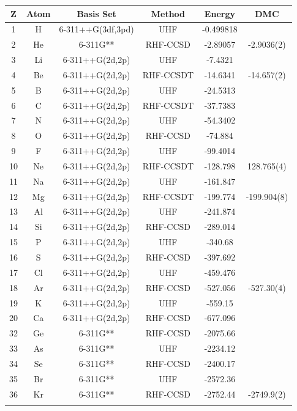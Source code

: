 \documentclass[a4paper,norsk,11pt,twoside]{report}
\begin{document}
\begin{center}
\begin{tabular}{ c c c c c c }
	\hline
  	Z & Atom & Basis Set & Method & Energy & DMC \\ \hline
  	1 & H & 6-311++G(3df,3pd) & UHF & -0.499818
  	&  \\
  	2 & He & 6-311G** & RHF-CCSD & -2.89057 
  	& -2.9036(2) \\ \hline
  	3 & Li & 6-311++G(2d,2p) & UHF & -7.4321 
  	& \\
  	4 & Be & 6-311++G(2d,2p) & RHF-CCSDT & -14.6341 & -14.657(2) \\
  	5 & B & 6-311++G(2d,2p) & UHF & -24.5313& \\
  	6 & C & 6-311++G(2d,2p) & RHF-CCSDT & -37.7383 &\\
  	7 & N & 6-311++G(2d,2p) & UHF & -54.3402 &\\
  	8 & O & 6-311++G(2d,2p) & RHF-CCSD & -74.884& \\
  	9 & F & 6-311++G(2d,2p) & UHF & -99.4014& \\
  	10 & Ne & 6-311++G(2d,2p) & RHF-CCSDT & -128.798 & 128.765(4) \\  \hline
  	11 & Na & 6-311++G(2d,2p) & UHF & -161.847& \\
  	12 & Mg & 6-311++G(2d,2p) & RHF-CCSDT & -199.774 & -199.904(8)\\
  	13 & Al & 6-311++G(2d,2p) & UHF & -241.874& \\
  	14 & Si & 6-311++G(2d,2p) & RHF-CCSD & -289.014 &\\
  	15 & P & 6-311++G(2d,2p) & UHF & -340.68& \\ 
  	16 & S & 6-311++G(2d,2p) & RHF-CCSD & -397.692 &\\
  	17 & Cl & 6-311++G(2d,2p) & UHF & -459.476& \\
  	18 & Ar & 6-311++G(2d,2p) & RHF-CCSD & -527.056& -527.30(4) \\
  	\hline
  	19 & K & 6-311++G(2d,2p) & UHF & -559.15& \\
  	20 & Ca & 6-311++G(2d,2p) & RHF-CCSD & -677.096& \\ \hline
  	32 & Ge & 6-311G** & RHF-CCSD & -2075.66& \\
  	33 & As & 6-311G** & UHF & -2234.12& \\
  	34 & Se & 6-311G** & RHF-CCSD & -2400.17& \\
  	35 & Br & 6-311G** & UHF & -2572.36 &\\
  	36 & Kr & 6-311G** & RHF-CCSD & -2752.44& -2749.9(2) \\
  	\hline
  	\\
	\end{tabular}
\end{center}
\end{document}
